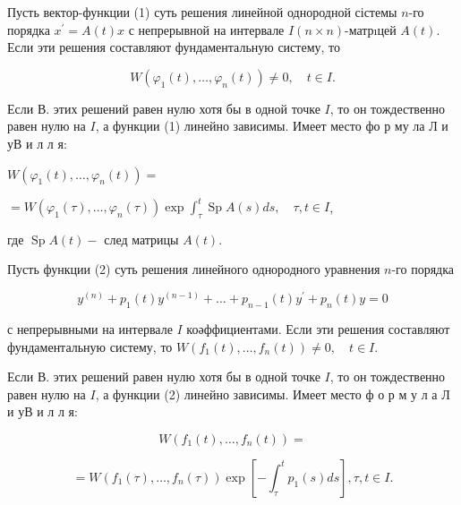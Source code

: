 \documentclass[10pt]{article}
\begin{document}
Пусть вектор-функции (1) суть решения линейной однородной сістемы $n$-го порядка $x^{\prime}=A(t) x$ с непрерывной на интервале $I(n \times n)$-матрıцей $A(t)$. Если эти решения составляют фундаментальную систему, то



\[

W\left(\varphi_{1}(t), \ldots, \varphi_{n}(t)\right) \neq 0, \quad t \in I .

\]



Если В. этих решений равен нулю хотя бы в одной точке $I$, то он тождественно равен нулю на $I$, а функции (1) линейно зависимы. Имеет место фо р му ла Л и уВ и л л я:



$W\left(\varphi_{1}(t), \ldots, \varphi_{n}(t)\right)=$



$=W\left(\varphi_{1}(\tau), \ldots, \varphi_{n}(\tau)\right) \exp \int_{\tau}^{t} \operatorname{Sp} A(s) d s, \quad \tau, t \in I$,



где $\operatorname{Sp} A(t)-$ след матрицы $A(t)$.



Пусть функции (2) суть решения линейного однородного уравнения $n$-го порядка



\[

y^{(n)}+p_{1}(t) y^{(n-1)}+\ldots+p_{n-1}(t) y^{\prime}+p_{n}(t) y=0

\]



с непрерывными на интервале $I$ коәффициентами. Если эти решения составляют фундаментальную систему, то $W\left(f_{1}(t), \ldots, f_{n}(t)\right) \neq 0, \quad t \in I$.



Если В. этих решений равен нулю хотя бы в одной точке $I$, то он тождественно равен нулю на $I$, а функции (2) линейно зависимы. Имеет место ф о р м у л а Л и уВ и л л я:



\[

W\left(f_{1}(t), \ldots, f_{n}(t)\right)=

\]



\[

=W\left(f_{1}(\tau), \ldots, f_{n}(\tau)\right) \exp \left[-\int_{\tau}^{t} p_{1}(s) d s\right], \tau, t \in I .

\]
\end{document}
